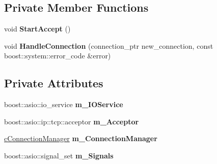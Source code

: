 \subsection*{Private Member Functions}
\begin{DoxyCompactItemize}
\item 
\hypertarget{classhttp__server_1_1cHttpServer_abec1513422a3b70b8c3684f4dc8c6271}{void {\bfseries Start\-Accept} ()}\label{classhttp__server_1_1cHttpServer_abec1513422a3b70b8c3684f4dc8c6271}

\item 
\hypertarget{classhttp__server_1_1cHttpServer_adfe4c5b575c0e94174a64d228f152d46}{void {\bfseries Handle\-Connection} (connection\-\_\-ptr new\-\_\-connection, const boost\-::system\-::error\-\_\-code \&error)}\label{classhttp__server_1_1cHttpServer_adfe4c5b575c0e94174a64d228f152d46}

\end{DoxyCompactItemize}
\subsection*{Private Attributes}
\begin{DoxyCompactItemize}
\item 
\hypertarget{classhttp__server_1_1cHttpServer_ae02a73720c1b0fa45b787ef0cecacb6c}{boost\-::asio\-::io\-\_\-service {\bfseries m\-\_\-\-I\-O\-Service}}\label{classhttp__server_1_1cHttpServer_ae02a73720c1b0fa45b787ef0cecacb6c}

\item 
\hypertarget{classhttp__server_1_1cHttpServer_a2d4db5bec75f0594e81403e8659ec2a0}{boost\-::asio\-::ip\-::tcp\-::acceptor {\bfseries m\-\_\-\-Acceptor}}\label{classhttp__server_1_1cHttpServer_a2d4db5bec75f0594e81403e8659ec2a0}

\item 
\hypertarget{classhttp__server_1_1cHttpServer_a87a2959bcad40f733bb9bd79f03bc017}{\hyperlink{classhttp__server_1_1cConnectionManager}{c\-Connection\-Manager} {\bfseries m\-\_\-\-Connection\-Manager}}\label{classhttp__server_1_1cHttpServer_a87a2959bcad40f733bb9bd79f03bc017}

\item 
\hypertarget{classhttp__server_1_1cHttpServer_a6332aa8cd965ba14ee125d90e309c483}{boost\-::asio\-::signal\-\_\-set {\bfseries m\-\_\-\-Signals}}\label{classhttp__server_1_1cHttpServer_a6332aa8cd965ba14ee125d90e309c483}

\end{DoxyCompactItemize}


